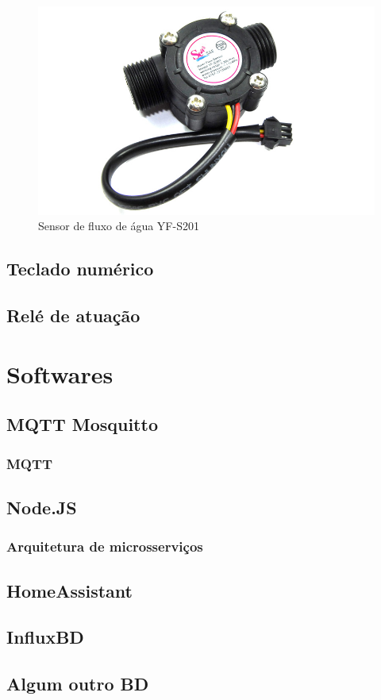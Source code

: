 \begin{figure}[htbp]
		\centering
		\includegraphics[scale=0.3]{figuras/yf-s201.jpg}
		\caption{Sensor de fluxo de água YF-S201}
		\label{sensor}
\end{figure}

\subsection{Teclado numérico}

\subsection{Relé de atuação}

\section{Softwares}

\subsection{MQTT Mosquitto}

\subsubsection{MQTT}

\subsection{Node.JS}

\subsubsection{Arquitetura de microsserviços}

\subsection{HomeAssistant}

\subsection{InfluxBD}

\subsection{Algum outro BD}
